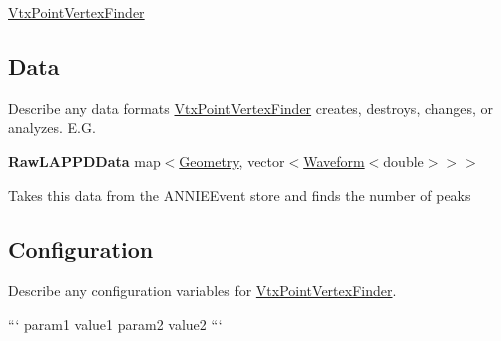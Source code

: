 \hyperlink{classVtxPointVertexFinder}{Vtx\-Point\-Vertex\-Finder}

\subsection*{Data}

Describe any data formats \hyperlink{classVtxPointVertexFinder}{Vtx\-Point\-Vertex\-Finder} creates, destroys, changes, or analyzes. E.\-G.

{\bfseries Raw\-L\-A\-P\-P\-D\-Data} {\ttfamily map$<$\hyperlink{classGeometry}{Geometry}, vector$<$\hyperlink{classWaveform}{Waveform}$<$double$>$$>$$>$}
\begin{DoxyItemize}
\item Takes this data from the {\ttfamily A\-N\-N\-I\-E\-Event} store and finds the number of peaks
\end{DoxyItemize}

\subsection*{Configuration}

Describe any configuration variables for \hyperlink{classVtxPointVertexFinder}{Vtx\-Point\-Vertex\-Finder}.

``` param1 value1 param2 value2 ``` 